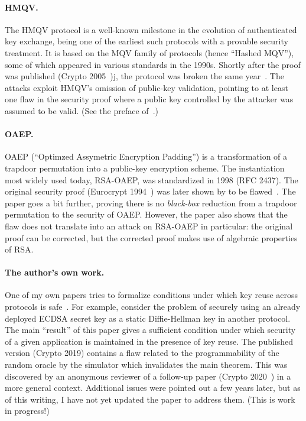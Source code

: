 \documentclass{article}
\begin{document}
\paragraph{HMQV.}
%
The HMQV protocol is a well-known milestone in the evolution of authenticated
key exchange, being one of the earliest such protocols with a provable security
treatment.
%
It is based on the MQV family of protocols (hence ``Hashed MQV''), some of
which appeared in various standards in the 1990s.
%
Shortly after the proof was published (Crypto 2005~\cite{Kra05})j, the protocol
was broken the same year~\cite{Men05}.
%
The attacks exploit HMQV's omission of public-key validation, pointing to at
least one flaw in the security proof where a public key controlled by the
attacker was assumed to be valid. (See the preface of~\cite{Kra05}.)

\paragraph{OAEP.}
%
OAEP (``Optimzed Assymetric Encryption Padding'') is a transformation of a
trapdoor permutation into a public-key encryption scheme. The instantiation
most widely used today, RSA-OAEP, was standardized in 1998 (RFC 2437).
%
The original security proof (Eurocrypt 1994~\cite{BR94}) was later shown by to
be flawed~\cite{Sho01}. The paper goes a bit further, proving there is no
\emph{black-box} reduction from a trapdoor permutation to the security of
OAEP.
%
However, the paper also shows that the flaw does not translate into an attack
on RSA-OAEP in particular: the original proof can be corrected, but the
corrected proof makes use of algebraic properties of RSA.

\paragraph{The author's own work.}
%
One of my own papers tries to formalize conditions under which key reuse across
protocols is safe~\cite{PS19}. For example, consider the problem of securely
using an already deployed ECDSA secret key as a static Diffie-Hellman key in
another protocol.
%
The main ``result'' of this paper gives a sufficient condition under which
security of a given application is maintained in the presence of key reuse.
%
The published version (Crypto 2019) contains a flaw related to the
programmability of the random oracle by the simulator which invalidates the
main theorem.
%
This was discovered by an anonymous reviewer of a follow-up paper (Crypto
2020~\cite{PS20}) in a more general context.
%
Additional issues were pointed out a few years later, but as of this writing, I
have not yet updated the paper to address them. (This is work in progress!)
\end{document}

